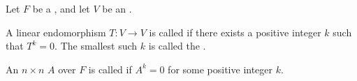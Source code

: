 \begin{definition} \label{definition:nilpotent_endomorphism_and_nilpotent_matrix}
    Let $F$ be a , and let $V$ be an .

    A linear endomorphism $T: V \to V$ is called  if there exists a positive integer $k$ such that $T^k = 0$. The smallest such $k$ is called the .

    An $n \times n$  $A$ over $F$ is called  if $A^k = 0$ for some positive integer $k$.

\end{definition}
